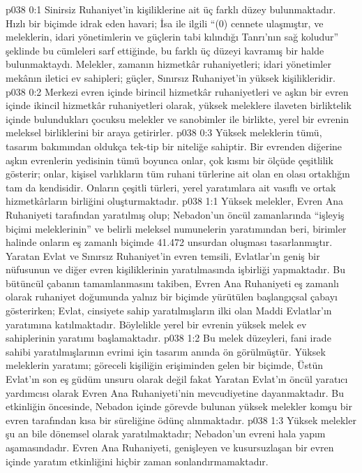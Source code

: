 \vs p038 0:1 Sinirsiz Ruhaniyet’in kişiliklerine ait üç farklı düzey bulunmaktadır. Hızlı bir biçimde idrak eden havari; İsa ile ilgili “(0) cennete ulaşmıştır, ve meleklerin, idari yönetimlerin ve güçlerin tabi kılındığı Tanrı’nın sağ koludur” şeklinde bu cümleleri sarf ettiğinde, bu farklı üç düzeyi kavramış bir halde bulunmaktaydı. Melekler, zamanın hizmetkâr ruhaniyetleri; idari yönetimler mekânın iletici ev sahipleri; güçler, Sınırsız Ruhaniyet’in yüksek kişilikleridir.
\vs p038 0:2 Merkezi evren içinde birincil hizmetkâr ruhaniyetleri ve aşkın bir evren içinde ikincil hizmetkâr ruhaniyetleri olarak, yüksek meleklere ilaveten birliktelik içinde bulundukları çocuksu melekler ve sanobimler ile birlikte, yerel bir evrenin meleksel birliklerini bir araya getirirler.
\vs p038 0:3 Yüksek meleklerin tümü, tasarım bakımından oldukça tek\hyp{}tip bir niteliğe sahiptir. Bir evrenden diğerine aşkın evrenlerin yedisinin tümü boyunca onlar, çok kısmı bir ölçüde çeşitlilik gösterir; onlar, kişisel varlıkların tüm ruhani türlerine ait olan en olası ortaklığın tam da kendisidir. Onların çeşitli türleri, yerel yaratımlara ait vasıflı ve ortak hizmetkârların birliğini oluşturmaktadır.
\vs p038 1:1 Yüksek melekler, Evren Ana Ruhaniyeti tarafından yaratılmış olup; Nebadon’un öncül zamanlarında “işleyiş biçimi meleklerinin” ve belirli meleksel numunelerin yaratımından beri, birimler halinde onların eş zamanlı biçimde 41.472 unsurdan oluşması tasarlanmıştır. Yaratan Evlat ve Sınırsız Ruhaniyet’in evren temsili, Evlatlar’ın geniş bir nüfusunun ve diğer evren kişiliklerinin yaratılmasında işbirliği yapmaktadır. Bu bütüncül çabanın tamamlanmasını takiben, Evren Ana Ruhaniyeti eş zamanlı olarak ruhaniyet doğumunda yalnız bir biçimde yürütülen başlangıçsal çabayı gösterirken; Evlat, cinsiyete sahip yaratılmışların ilki olan Maddi Evlatlar’ın yaratımına katılmaktadır. Böylelikle yerel bir evrenin yüksek melek ev sahiplerinin yaratımı başlamaktadır.
\vs p038 1:2 Bu melek düzeyleri, fani irade sahibi yaratılmışlarının evrimi için tasarım anında ön görülmüştür. Yüksek meleklerin yaratımı; göreceli kişiliğin erişiminden gelen bir biçimde, Üstün Evlat’ın son eş güdüm unsuru olarak değil fakat Yaratan Evlat’ın öncül yaratıcı yardımcısı olarak Evren Ana Ruhaniyeti’nin mevcudiyetine dayanmaktadır. Bu etkinliğin öncesinde, Nebadon içinde görevde bulunan yüksek melekler komşu bir evren tarafından kısa bir süreliğine ödünç alınmaktadır.
\vs p038 1:3 Yüksek melekler şu an bile dönemsel olarak yaratılmaktadır; Nebadon’un evreni hala yapım aşamasındadır. Evren Ana Ruhaniyeti, genişleyen ve kusursuzlaşan bir evren içinde yaratım etkinliğini hiçbir zaman sonlandırmamaktadır.
